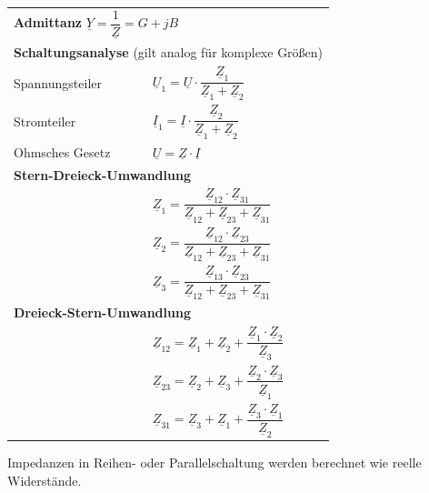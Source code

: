 \documentclass[a4paper,12pt]{scrartcl}
\begin{document}
\newpage
\begin{tabular}{@{} l l @{}}

\multicolumn{2}{l}{\textbf{Admittanz} \enspace $\underline{Y} = \dfrac{1}{\underline{Z}} = G + jB$} \\[3mm]

\multicolumn{2}{l}{\textbf{Schaltungsanalyse} (gilt analog für komplexe Größen)} \\
\hspace*{20mm} Spannungsteiler & $\underline{U}_1 = \underline{U}\cdot\dfrac{\underline{Z}_1}{\underline{Z}_1 + \underline{Z}_2}$ \\
\hspace*{20mm} Stromteiler & $\underline{I}_1 = \underline{I}\cdot\dfrac{\underline{Z}_2}{\underline{Z}_1 + \underline{Z}_2}$ \\
\hspace*{20mm} Ohmsches Gesetz & $\underline{U} = \underline{Z}\cdot\underline{I}$ \\[3mm]

\multicolumn{2}{l}{\textbf{Stern-Dreieck-Umwandlung}} \\
& $\underline{Z}_1 = \dfrac{\underline{Z}_{12}\cdot\underline{Z}_{31}}{\underline{Z}_{12} + \underline{Z}_{23} + \underline{Z}_{31}}$ \\
& $\underline{Z}_2 = \dfrac{\underline{Z}_{12}\cdot\underline{Z}_{23}}{\underline{Z}_{12} + \underline{Z}_{23} + \underline{Z}_{31}}$ \\
& $\underline{Z}_3 = \dfrac{\underline{Z}_{13}\cdot\underline{Z}_{23}}{\underline{Z}_{12} + \underline{Z}_{23} + \underline{Z}_{31}}$ \\[3mm]

\multicolumn{2}{l}{\textbf{Dreieck-Stern-Umwandlung}} \\
& $\underline{Z}_{12} = \underline{Z}_1 + \underline{Z}_2 + \dfrac{\underline{Z}_1\cdot\underline{Z}_2}{\underline{Z}_3}$ \\
& $\underline{Z}_{23} = \underline{Z}_2 + \underline{Z}_3 + \dfrac{\underline{Z}_2\cdot\underline{Z}_3}{\underline{Z}_1}$ \\
& $\underline{Z}_{31} = \underline{Z}_3 + \underline{Z}_1 + \dfrac{\underline{Z}_3\cdot\underline{Z}_1}{\underline{Z}_2}$ \\

\end{tabular}

\vspace*{5mm}
Impedanzen in Reihen- oder Parallelschaltung werden berechnet wie reelle Widerstände.
\end{document}
